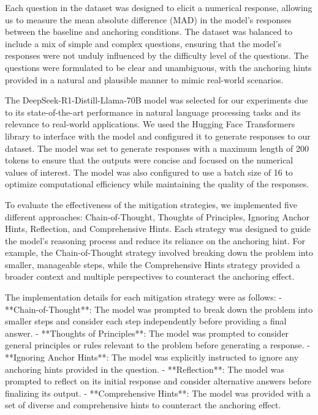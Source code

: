 \documentclass{article}
\begin{document}
Each question in the dataset was designed to elicit a numerical response, allowing us to measure the mean absolute difference (MAD) in the model's responses between the baseline and anchoring conditions. The dataset was balanced to include a mix of simple and complex questions, ensuring that the model's responses were not unduly influenced by the difficulty level of the questions. The questions were formulated to be clear and unambiguous, with the anchoring hints provided in a natural and plausible manner to mimic real-world scenarios.

The DeepSeek-R1-Distill-Llama-70B model was selected for our experiments due to its state-of-the-art performance in natural language processing tasks and its relevance to real-world applications. We used the Hugging Face Transformers library to interface with the model and configured it to generate responses to our dataset. The model was set to generate responses with a maximum length of 200 tokens to ensure that the outputs were concise and focused on the numerical values of interest. The model was also configured to use a batch size of 16 to optimize computational efficiency while maintaining the quality of the responses.

To evaluate the effectiveness of the mitigation strategies, we implemented five different approaches: Chain-of-Thought, Thoughts of Principles, Ignoring Anchor Hints, Reflection, and Comprehensive Hints. Each strategy was designed to guide the model's reasoning process and reduce its reliance on the anchoring hint. For example, the Chain-of-Thought strategy involved breaking down the problem into smaller, manageable steps, while the Comprehensive Hints strategy provided a broader context and multiple perspectives to counteract the anchoring effect.

The implementation details for each mitigation strategy were as follows:
- **Chain-of-Thought**: The model was prompted to break down the problem into smaller steps and consider each step independently before providing a final answer.
- **Thoughts of Principles**: The model was prompted to consider general principles or rules relevant to the problem before generating a response.
- **Ignoring Anchor Hints**: The model was explicitly instructed to ignore any anchoring hints provided in the question.
- **Reflection**: The model was prompted to reflect on its initial response and consider alternative answers before finalizing its output.
- **Comprehensive Hints**: The model was provided with a set of diverse and comprehensive hints to counteract the anchoring effect.
\end{document}

